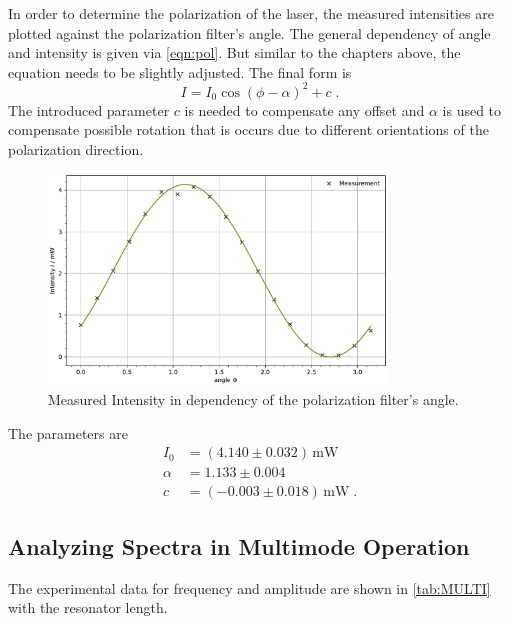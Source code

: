 In order to determine the polarization of the laser, the measured intensities are plotted against the polarization filter's angle.
The general dependency of angle and intensity is given via \eqref{eqn:pol}. But similar to the chapters above, the equation needs to be slightly adjusted.
The final form is
\begin{equation*}
    I=I_0\cos(\phi-\alpha)^2+c\; .
\end{equation*}
The introduced parameter $c$ is needed to compensate any offset and $\alpha$ is used to compensate possible rotation that is occurs due to different orientations of the polarization direction.
\begin{figure}
	\centering
	\includegraphics[width=0.8\textwidth]{content/plots/POLARI.pdf}
	\caption{Measured Intensity in dependency of the polarization filter's angle.}
	\label{fig:POLARI}
\end{figure}
The parameters are
\begin{align*}
    I_0 &= (4.140\pm 0.032) \, \text{mW}\\
\alpha &= 1.133\pm 0.004\\
c &= (-0.003\pm 0.018)\, \text{mW}\; .
\end{align*}

\subsection{Analyzing Spectra in Multimode Operation}

The experimental data for frequency and amplitude are shown in \autoref{tab:MULTI} with the resonator length.

